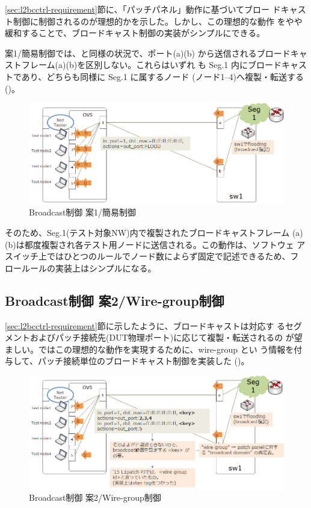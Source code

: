 \ref{sec:l2bcctrl-requirement}節に、「パッチパネル」動作に基づいてブロー
ドキャスト制御に制御されるのが理想的かを示した。しかし、この理想的な動作
をやや緩和することで、ブロードキャスト制御の実装がシンプルにできる。

案1/簡易制御では、と同様の状況で、ポート(a)(b)
から送信されるブロードキャストフレーム(a)(b)を区別しない。これらはいずれ
も Seg.1 内にブロードキャストであり、どちらも同様に Seg.1 に属するノード
(ノード1--4)へ複製・転送する()。

\begin{figure}[h]
 \centering
 \includegraphics[scale=0.6]{img/l2bcctrl_plan1_design.png}
 \caption{Broadcast制御 案1/簡易制御}
 \label{fig:l2bcctrl_plan1_design}
\end{figure}

そのため、Seg.1(テスト対象NW)内で複製されたブロードキャストフレーム
(a)(b)は都度複製され各テスト用ノードに送信される。この動作は、ソフトウェ
アスイッチ上ではひとつのルールでノード数によらず固定で記述できるため、フ
ロールールの実装上はシンプルになる。

  \subsection{Broadcast制御 案2/Wire-group制御}
  \label{sec:l2bcctrl-plan2}

\ref{sec:l2bcctrl-requirement}節に示したように、ブロードキャストは対応す
るセグメントおよびパッチ接続先(DUT物理ポート)に応じて複製・転送されるの
が望ましい。\lopjc ではこの理想的な動作を実現するために、wire-group とい
う情報を付与して、パッチ接続単位のブロードキャスト制御を実装した
()。

\begin{figure}[h]
 \centering
 \includegraphics[scale=0.6]{img/l2bcctrl_plan2_design.png}
 \caption{Broadcast制御 案2/Wire-group制御}
 \label{fig:l2bcctrl_plan2_design}
\end{figure}

